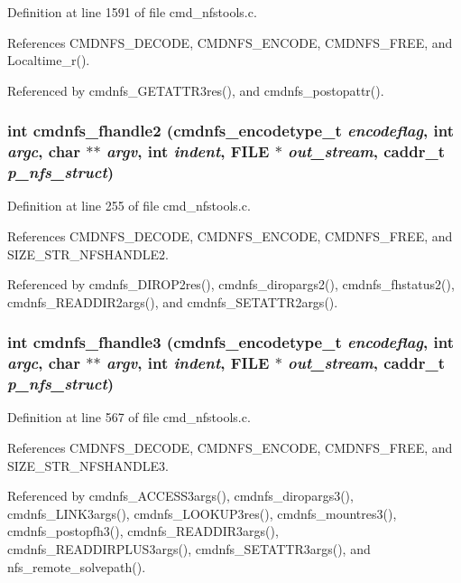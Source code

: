 Definition at line 1591 of file cmd\_\-nfstools.c.

References CMDNFS\_\-DECODE, CMDNFS\_\-ENCODE, CMDNFS\_\-FREE, and Localtime\_\-r().

Referenced by cmdnfs\_\-GETATTR3res(), and cmdnfs\_\-postopattr().
\subsubsection{\setlength{\rightskip}{0pt plus 5cm}int cmdnfs\_\-fhandle2 ({\bf cmdnfs\_\-encodetype\_\-t} {\em encodeflag}, int {\em argc}, char $\ast$$\ast$ {\em argv}, int {\em indent}, FILE $\ast$ {\em out\_\-stream}, caddr\_\-t {\em p\_\-nfs\_\-struct})}\label{cmd__nfstools_8c_a61}




Definition at line 255 of file cmd\_\-nfstools.c.

References CMDNFS\_\-DECODE, CMDNFS\_\-ENCODE, CMDNFS\_\-FREE, and SIZE\_\-STR\_\-NFSHANDLE2.

Referenced by cmdnfs\_\-DIROP2res(), cmdnfs\_\-diropargs2(), cmdnfs\_\-fhstatus2(), cmdnfs\_\-READDIR2args(), and cmdnfs\_\-SETATTR2args().
\subsubsection{\setlength{\rightskip}{0pt plus 5cm}int cmdnfs\_\-fhandle3 ({\bf cmdnfs\_\-encodetype\_\-t} {\em encodeflag}, int {\em argc}, char $\ast$$\ast$ {\em argv}, int {\em indent}, FILE $\ast$ {\em out\_\-stream}, caddr\_\-t {\em p\_\-nfs\_\-struct})}\label{cmd__nfstools_8c_a66}




Definition at line 567 of file cmd\_\-nfstools.c.

References CMDNFS\_\-DECODE, CMDNFS\_\-ENCODE, CMDNFS\_\-FREE, and SIZE\_\-STR\_\-NFSHANDLE3.

Referenced by cmdnfs\_\-ACCESS3args(), cmdnfs\_\-diropargs3(), cmdnfs\_\-LINK3args(), cmdnfs\_\-LOOKUP3res(), cmdnfs\_\-mountres3(), cmdnfs\_\-postopfh3(), cmdnfs\_\-READDIR3args(), cmdnfs\_\-READDIRPLUS3args(), cmdnfs\_\-SETATTR3args(), and nfs\_\-remote\_\-solvepath().
